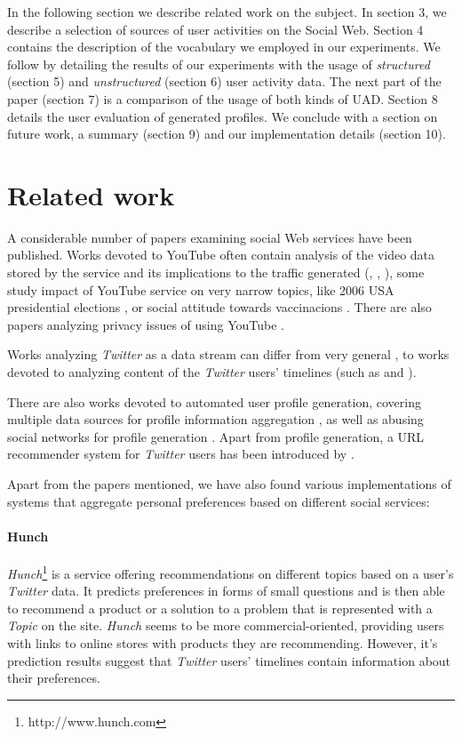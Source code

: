 In the following section we describe related work on the subject. In section 3, we describe
a selection of sources of user activities on the Social Web. Section 4 contains the description of
the vocabulary we employed in our experiments. We follow by detailing the results of our experiments
with the usage of \textit{structured} (section 5) and \textit{unstructured} (section 6) user activity data.
The next part of the paper (section 7) is a comparison of the usage of both kinds of UAD. Section 8
details the user evaluation of generated profiles. We conclude with a section on future
work, a summary (section 9) and our implementation details (section 10).

\section{Related work}

A considerable number of papers examining social Web services have been
published. Works devoted to YouTube often contain analysis of the video data
stored by the service and its implications to the traffic generated
(\cite{i-tube-you-tube}, \cite{views-from-the-edge},
\cite{statistics-and-social-network}), some study impact of YouTube service on
very narrow topics, like 2006 USA presidential elections
\cite{voters-myspace-youtube}, or social attitude towards vaccinacions
\cite{keelan}. There are also papers analyzing privacy issues of using YouTube
\cite{publicly-private}.

Works analyzing \textit{Twitter} as a data stream can differ from very general \cite{why-we-twitter},
to works devoted to analyzing content of the \textit{Twitter} users' timelines (such as \cite{twitter-content-is-it} and \cite{short-tweet}).

There are also works devoted to automated user profile generation, covering multiple data sources for profile
information aggregation \cite{public-profiles}, as well as abusing social networks for profile generation \cite{twitter-abuse}. Apart from profile generation, a URL recommender system for \textit{Twitter} users
has been introduced by \cite{short-tweet}.

Apart from the papers mentioned, we have also found various implementations of systems that aggregate personal preferences based on different
social services:

\paragraph{Hunch}
\textit{Hunch}\footnote{http://www.hunch.com} is a service offering recommendations on different topics based on a user's \textit{Twitter} data. It predicts preferences in forms of small questions and is then able to recommend a product or a solution to a problem that is represented with a \textit{Topic} on the site. \textit{Hunch} seems to be more commercial-oriented, \eg providing users with links to online stores with products they are recommending. However,
it's prediction results suggest that \textit{Twitter} users' timelines contain information about their preferences.


